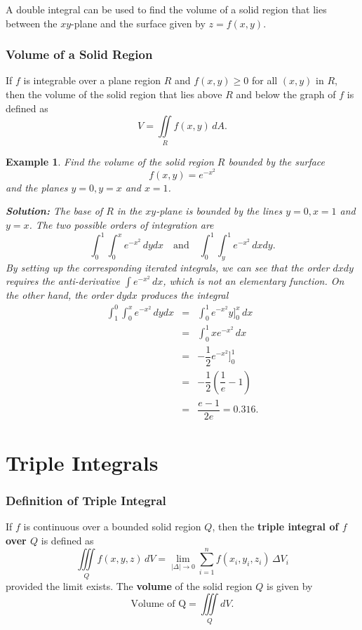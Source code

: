 \documentclass[titlepage,a4paper,12pt]{report}
\newtheorem{example}{Example}[section]
\begin{document}
\noindent A double integral can be used to find the volume of a solid region that lies between the $xy$-plane and the surface given by $z=f(x,y)$.
\subsubsection{Volume of a Solid Region}
If $f$ is integrable over a plane region $R$ and $f(x,y)\geq 0$ for all $(x,y)$ in $R$, then the volume of the solid region that lies above $R$ and below the graph of $f$ is defined as 
\[V= \iint \limits _R f(x,y)\, dA.\]
\begin{example}
Find the volume of the solid region $R$ bounded by the surface \[f(x,y)=e^{-x^2}\] and the planes $y=0, y=x$ and $x=1$.

\noindent \textbf{Solution:} The base of $R$ in the $xy$-plane is bounded by the lines $y=0, x=1$ and $y=x$. The two possible orders of integration are 
\[\int _0^1 \int _0^x e^{-x^2}\, dydx \quad \mbox{and} \quad \int _0^1 \int _y^1 e^{-x^2}\, dxdy.\] By setting up the corresponding iterated integrals, we can see that the order $dxdy$ requires the anti-derivative $\displaystyle \int e^{-x^2}\, dx$, which is not an elementary function. On the other hand, the order $dydx$ produces the integral
\begin{eqnarray*}
\int _1^0 \int _0^x e^{-x^2}\, dydx &=& \int _0^1 e^{-x^2}y\Biggl ]_0^x \, dx\\
&=& \int _0^1 xe^{-x^2}\, dx \\
&=& -\dfrac{1}{2}e^{-x^2}\Biggl ]_0^1\\
&=& -\dfrac{1}{2}\left(\dfrac{1}{e}-1\right)\\
&=& \dfrac{e-1}{2e} = 0.316.
\end{eqnarray*} 
\end{example}
\section{Triple Integrals}
\subsubsection{Definition of Triple Integral}
If $f$ is continuous over a bounded solid region $Q$, then the \textbf{triple integral of $f$ over $Q$} is defined as 
\[\iiint \limits _Q f(x,y,z)\, dV=\lim _{|\Delta|\rightarrow 0}\sum _{i=1}^n f(x_i, y_i, z_i)\, \Delta V_i \] provided the limit exists. The \textbf{volume} of the solid region $Q$ is given by 
\[\mbox{Volume of Q} =\iiint \limits _Q dV. \]
\end{document}
